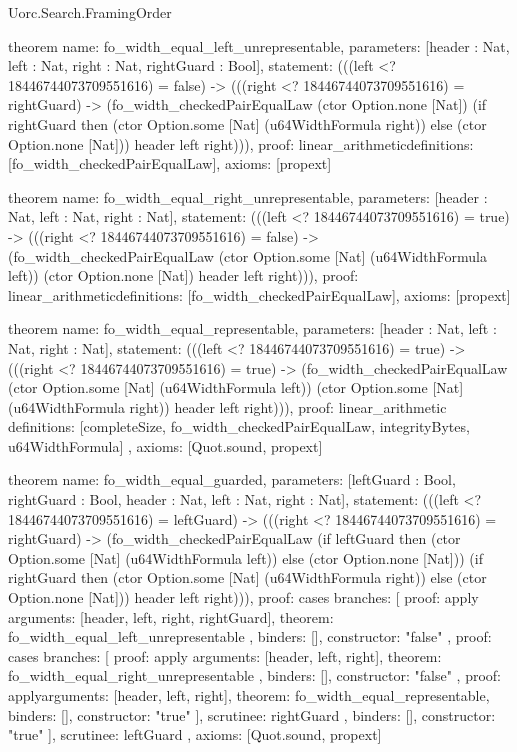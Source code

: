 \begin{lexlean}{Uorc.Search.FramingOrder}
\begin{semanticmodule}
theorem{
  name: fo_width_equal_left_unrepresentable,
  parameters: [header : Nat, left : Nat, right : Nat, rightGuard : Bool],
  statement: (((left <? 18446744073709551616) = false) -> (((right <? 18446744073709551616) = rightGuard) -> (fo_width_checkedPairEqualLaw (ctor Option.none [Nat]) (if rightGuard then (ctor Option.some [Nat] (u64WidthFormula right)) else (ctor Option.none [Nat])) header left right))),
  proof: linear_arithmetic{definitions: [fo_width_checkedPairEqualLaw]},
  axioms: [propext]
}

theorem{
  name: fo_width_equal_right_unrepresentable,
  parameters: [header : Nat, left : Nat, right : Nat],
  statement: (((left <? 18446744073709551616) = true) -> (((right <? 18446744073709551616) = false) -> (fo_width_checkedPairEqualLaw (ctor Option.some [Nat] (u64WidthFormula left)) (ctor Option.none [Nat]) header left right))),
  proof: linear_arithmetic{definitions: [fo_width_checkedPairEqualLaw]},
  axioms: [propext]
}

theorem{
  name: fo_width_equal_representable,
  parameters: [header : Nat, left : Nat, right : Nat],
  statement: (((left <? 18446744073709551616) = true) -> (((right <? 18446744073709551616) = true) -> (fo_width_checkedPairEqualLaw (ctor Option.some [Nat] (u64WidthFormula left)) (ctor Option.some [Nat] (u64WidthFormula right)) header left right))),
  proof: linear_arithmetic{
    definitions: [completeSize, fo_width_checkedPairEqualLaw, integrityBytes, u64WidthFormula]
  },
  axioms: [Quot.sound, propext]
}

theorem{
  name: fo_width_equal_guarded,
  parameters: [leftGuard : Bool, rightGuard : Bool, header : Nat, left : Nat, right : Nat],
  statement: (((left <? 18446744073709551616) = leftGuard) -> (((right <? 18446744073709551616) = rightGuard) -> (fo_width_checkedPairEqualLaw (if leftGuard then (ctor Option.some [Nat] (u64WidthFormula left)) else (ctor Option.none [Nat])) (if rightGuard then (ctor Option.some [Nat] (u64WidthFormula right)) else (ctor Option.none [Nat])) header left right))),
  proof: cases{
    branches: [
      {
        proof: apply{
          arguments: [header, left, right, rightGuard],
          theorem: fo_width_equal_left_unrepresentable
        },
        binders: [],
        constructor: "false"
      },
      {
        proof: cases{
          branches: [
            {
              proof: apply{
                arguments: [header, left, right],
                theorem: fo_width_equal_right_unrepresentable
              },
              binders: [],
              constructor: "false"
            },
            {
              proof: apply{arguments: [header, left, right], theorem: fo_width_equal_representable},
              binders: [],
              constructor: "true"
            }
          ],
          scrutinee: rightGuard
        },
        binders: [],
        constructor: "true"
      }
    ],
    scrutinee: leftGuard
  },
  axioms: [Quot.sound, propext]
}


\end{semanticmodule}
\end{lexlean}
